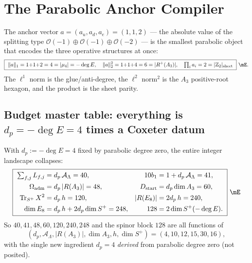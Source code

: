 \documentclass[11pt,a4paper]{article}
\newcommand{\Oadm}{\Omega_{\mathrm{adm}}}
\newcommand{\AL}{\mathcal A_\Lambda}
\newcommand{\Dstart}{D_{\mathrm{start}}}
\theoremstyle{definition}
\begin{document}
\section{The Parabolic Anchor Compiler}
The anchor vector $a=(a_u,a_d,a_e)=(1,1,2)$ --- the absolute value of the splitting type
$\mathcal O(-1)\oplus\mathcal O(-1)\oplus\mathcal O(-2)$ --- is the smallest parabolic object that
encodes the three operative structures at once:
\begin{equation}
  \boxed{\ \|a\|_1=1{+}1{+}2=4=|\mu_4|=-\deg E,\quad
  \|a\|_2^2=1{+}1{+}4=6=|R^+(A_3)|,\quad
  \textstyle\prod_i a_i=2=|\mathbb Z_2|_{\text{sheet}}\ }\ \mE .
\end{equation}
The $\ell^1$ norm is the glue/anti-degree, the $\ell^2$ norm$^2$ is the $A_3$ positive-root hexagon, and
the product is the sheet parity.

\subsection{Budget master table: everything is $d_p=-\deg E=4$ times a Coxeter datum}
With $d_p:=-\deg E=4$ fixed by parabolic degree zero, the entire integer landscape collapses:
\begin{equation}
\boxed{\ \setlength{\arraycolsep}{2pt}\begin{aligned}
  \textstyle\sum_{f,j}L_{f,j}&=d_p\,\AL=40, & 10b_1&=1+d_p\,\AL=41, \\
  \Oadm&=d_p\,|R(A_3)|=48, & \Dstart&=d_p\dim A_3=60, \\
  \operatorname{Tr}_{S^+}X^2&=d_p\,h=120, & |R(E_8)|&=2d_p\,h=240, \\
  \dim E_8&=d_p\,h+2d_p\dim S^+=248, & 128&=2\dim S^+(-\deg E).
\end{aligned}\ }\ \mE
\end{equation}
So $40,41,48,60,120,240,248$ and the spinor block $128$ are all functions of
\[(d_p,\AL,|R(A_3)|,\dim A_3,h,\dim S^+)=(4,10,12,15,30,16),\]
with the single new ingredient $d_p=4$ \emph{derived} from parabolic degree zero (not posited).
\end{document}
